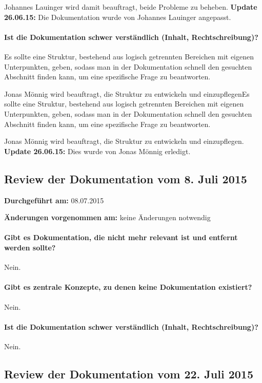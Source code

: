 Johannes Lauinger wird damit beauftragt, beide Probleme zu beheben. \textbf{Update 26.06.15:} Die Dokumentation wurde von Johannes Lauinger angepasst.

\paragraph{Ist die Dokumentation schwer verständlich (Inhalt, Rechtschreibung)?}
Es sollte eine Struktur, bestehend aus logisch getrennten Bereichen mit eigenen Unterpunkten, geben, sodass man in der Dokumentation schnell den gesuchten Abschnitt finden kann, um eine spezifische Frage zu beantworten.

Jonas Mönnig wird beauftragt, die Struktur zu entwickeln und einzupflegenEs sollte eine Struktur, bestehend aus logisch getrennten Bereichen mit eigenen Unterpunkten, geben, sodass man in der Dokumentation schnell den gesuchten Abschnitt finden kann, um eine spezifische Frage zu beantworten.

Jonas Mönnig wird beauftragt, die Struktur zu entwickeln und einzupflegen. \textbf{Update 26.06.15:} Dies wurde von Jonas Mönnig erledigt.


\subsection{Review der Dokumentation vom 8. Juli 2015}

\textbf{Durchgeführt am:} 08.07.2015

\textbf{Änderungen vorgenommen am:} keine Änderungen notwendig

\paragraph{Gibt es Dokumentation, die nicht mehr relevant ist und entfernt werden sollte?}
Nein.

\paragraph{Gibt es zentrale Konzepte, zu denen keine Dokumentation existiert?}
Nein.

\paragraph{Ist die Dokumentation schwer verständlich (Inhalt, Rechtschreibung)?}
Nein.


\subsection{Review der Dokumentation vom 22. Juli 2015}

